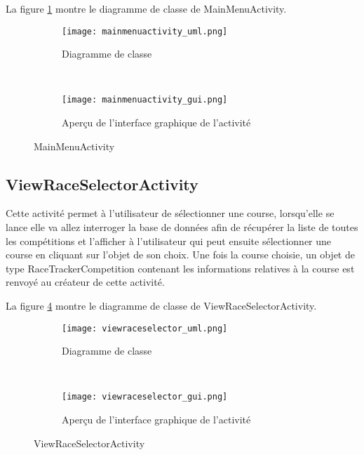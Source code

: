 La figure \ref{fig:mainmenuactivity_uml} montre le diagramme de classe de MainMenuActivity.

\begin{figure}[htb!]
    \centering
    \begin{subfigure}[htb]{0.49\textwidth}
		\texttt{[image: mainmenuactivity\_uml.png]} 
		\caption{Diagramme de classe}
		\label{fig:mainmenuactivity_uml}
    \end{subfigure}
    ~ %
    \begin{subfigure}[htb]{0.49\textwidth}
		\texttt{[image: mainmenuactivity\_gui.png]} 
		\caption{Aperçu de l'interface graphique de l'activité}
		\label{fig:mainmenuactivity_gui}
    \end{subfigure}
    \caption{MainMenuActivity}\label{fig:mainmenuactivity_fig}
\end{figure}

\subsection{ViewRaceSelectorActivity}

Cette activité permet à l'utilisateur de sélectionner une course, lorsqu'elle se lance elle va allez interroger la base de données afin de récupérer la liste de toutes les compétitions et l'afficher à l'utilisateur qui peut ensuite sélectionner une course en cliquant sur l'objet de son choix. Une fois la course choisie, un objet de type RaceTrackerCompetition contenant les informations relatives à la course est renvoyé au créateur de cette activité.

La figure \ref{fig:viewraceselector_uml} montre le diagramme de classe de ViewRaceSelectorActivity.

\begin{figure}[htb!]
    \centering
    \begin{subfigure}[htb]{0.49\textwidth}
		\texttt{[image: viewraceselector\_uml.png]} 
		\caption{Diagramme de classe}
		\label{fig:viewraceselector_uml}
    \end{subfigure}
    ~ %
    \begin{subfigure}[htb]{0.49\textwidth}
		\texttt{[image: viewraceselector\_gui.png]} 
		\caption{Aperçu de l'interface graphique de l'activité}
		\label{fig:viewraceselector_gui}
    \end{subfigure}
    \caption{ViewRaceSelectorActivity}\label{fig:viewraceselector_fig}
\end{figure}

